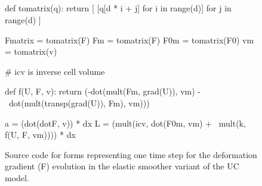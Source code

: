 \subsection{}

\begin{figure}
\begin{python}
def tomatrix(q):
    return [ [q[d * i + j] for i in range(d)] for j in range(d) ]

Fmatrix = tomatrix(F)
Fm = tomatrix(F)
F0m = tomatrix(F0)
vm = tomatrix(v)

# icv is inverse cell volume

def f(U, F, v):
    return (-dot(mult(Fm, grad(U)), vm) - \
     dot(mult(transp(grad(U)), Fm), vm)))

a = (dot(dotF, v)) * dx
L = (mult(icv, dot(F0m, vm) + \
  mult(k, f(U, F, vm)))) * dx
\end{python}
\caption{Source code for forms representing one time step for the
deformation gradient (F) evolution in the elastic smoother variant of
the UC model.}
\label{code:FFC_ElasticSmoother}
\end{figure}


